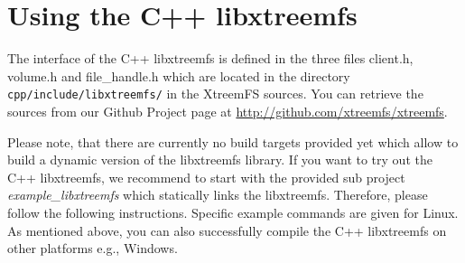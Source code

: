 \documentclass[a4paper,10pt]{book}
\begin{document}
\section{Using the C++ libxtreemfs}
\label{sec:libxtreemfs_cpp}

The interface of the C++ libxtreemfs is defined in the three files client.h,
volume.h and file\_handle.h which are located in the directory
\texttt{cpp/include/libxtreemfs/} in the XtreemFS sources. You can retrieve the
sources from our Github Project page at \url{http://github.com/xtreemfs/xtreemfs}.

Please note, that there are currently no build targets provided yet which allow to build a dynamic version of the libxtreemfs library. If you want to try out the C++ libxtreemfs, we recommend to start with the provided sub project \emph{example\_libxtreemfs} which statically links the libxtreemfs. Therefore, please follow the following instructions. Specific example commands are given for Linux. As mentioned above, you can also successfully compile the C++ libxtreemfs on other platforms e.g., Windows.
\end{document}

